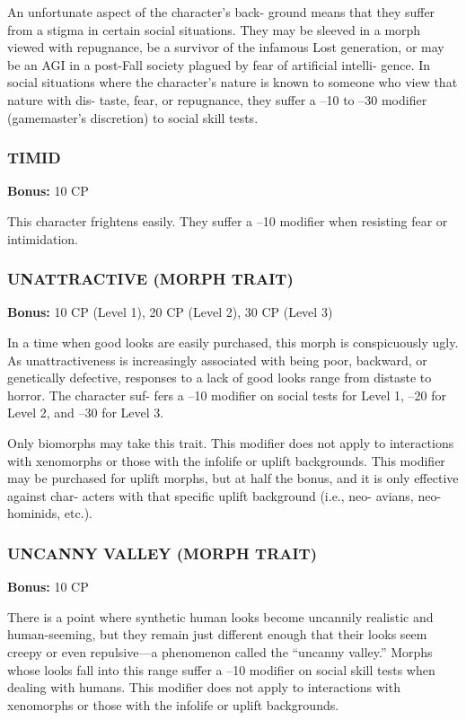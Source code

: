 An unfortunate aspect of the character’s back-
ground means that they suffer from a stigma in
certain social situations. They may be sleeved in
a morph viewed with repugnance, be a survivor of
the infamous Lost generation, or may be an AGI in
a post-Fall society plagued by fear of artificial intelli-
gence. In social situations where the character’s nature
is known to someone who view that nature with dis-
taste, fear, or repugnance, they suffer a –10 to –30
modifier (gamemaster’s discretion) to social skill tests.

\subsubsection{TIMID}
\textbf{Bonus:} 10 CP

 This character frightens easily. They suffer a –10
modifier when resisting fear or intimidation.

\subsubsection{UNATTRACTIVE (MORPH TRAIT)}
\textbf{Bonus:} 10 CP (Level 1), 20 CP (Level 2), 30 CP (Level 3)

In a time when good looks are easily purchased,
this morph is conspicuously ugly. As unattractiveness
is increasingly associated with being poor, backward,
or genetically defective, responses to a lack of good
looks range from distaste to horror. The character suf-
fers a –10 modifier on social tests for Level 1, –20 for
Level 2, and –30 for Level 3.

Only biomorphs may take this trait. This modifier
does not apply to interactions with xenomorphs or
those with the infolife or uplift backgrounds. This
modifier may be purchased for uplift morphs, but at
half the bonus, and it is only effective against char-
acters with that specific uplift background (i.e., neo-
avians, neo-hominids, etc.).

\subsubsection{UNCANNY VALLEY (MORPH TRAIT)}
\textbf{Bonus:} 10 CP

There is a point where synthetic human looks
become uncannily realistic and human-seeming, but
they remain just different enough that their looks
seem creepy or even repulsive—a phenomenon called
the “uncanny valley.” Morphs whose looks fall into
this range suffer a –10 modifier on social skill tests
when dealing with humans. This modifier does not
apply to interactions with xenomorphs or those with
the infolife or uplift backgrounds.

